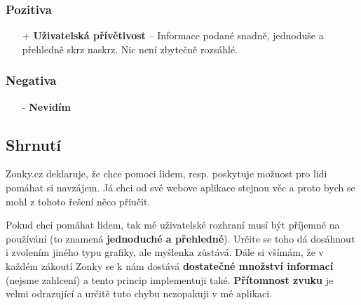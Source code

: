 \subsubsection*{Pozitiva}
\begin{itemize}
    \item[+] \textbf{Uživatelská přívětivost} -- Informace podané snadně, jednoduše a přehledně skrz naskrz. Nic není zbytečně rozsáhlé.
\end{itemize}
\subsubsection*{Negativa}
\begin{itemize}
    \item[-] \textbf{Nevidím}
\end{itemize}



\newpage
\subsection{Shrnutí}
Zonky.cz deklaruje, že chce pomoci lidem, resp. poskytuje možnost pro lidi pomáhat si navzájem. Já chci od své webove aplikace stejnou věc a proto bych se mohl z tohoto řešení něco přiučit.

Pokud chci pomáhat lidem, tak mé uživatelské rozhraní musí být příjemné na používání (to znamená \textbf{jednoduché a přehledné}). Určite se toho dá dosáhnout i zvolením jiného typu grafiky, ale myšlenka zůstává. Dále si všímám, že v každém zákoutí Zonky se k nám dostává \textbf{ dostatečné množství informací} (nejsme zahlcení) a tento princip implementuji také. \textbf{Přítomnost zvuku} je velmi odrazující a určitě tuto chybu nezopakuji v mé aplikaci.